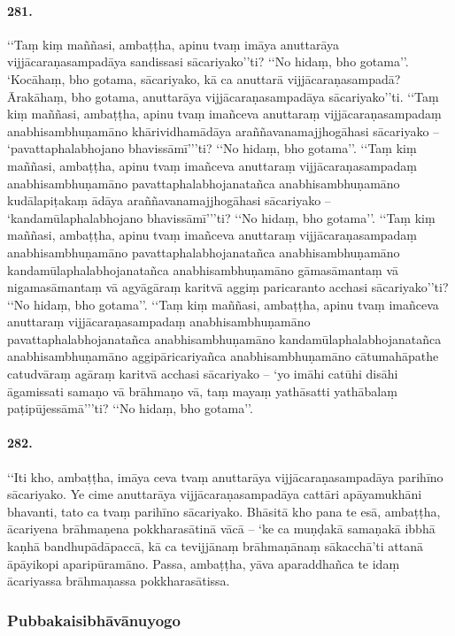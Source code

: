 \paragraph{281.} ‘‘Taṃ kiṃ maññasi, ambaṭṭha, apinu tvaṃ imāya anuttarāya vijjācaraṇasampadāya sandissasi sācariyako’’ti? ‘‘No hidaṃ, bho gotama’’. ‘Kocāhaṃ, bho gotama, sācariyako, kā ca anuttarā vijjācaraṇasampadā? Ārakāhaṃ, bho gotama, anuttarāya vijjācaraṇasampadāya sācariyako’’ti. ‘‘Taṃ kiṃ maññasi, ambaṭṭha, apinu tvaṃ imañceva anuttaraṃ vijjācaraṇasampadaṃ anabhisambhuṇamāno khārividhamādāya araññavanamajjhogāhasi sācariyako – ‘pavattaphalabhojano bhavissāmī’’’ti? ‘‘No hidaṃ, bho gotama’’. ‘‘Taṃ kiṃ maññasi, ambaṭṭha, apinu tvaṃ imañceva anuttaraṃ vijjācaraṇasampadaṃ anabhisambhuṇamāno pavattaphalabhojanatañca anabhisambhuṇamāno kudālapiṭakaṃ ādāya araññavanamajjhogāhasi sācariyako – ‘kandamūlaphalabhojano bhavissāmī’’’ti? ‘‘No hidaṃ, bho gotama’’. ‘‘Taṃ kiṃ maññasi, ambaṭṭha, apinu tvaṃ imañceva anuttaraṃ vijjācaraṇasampadaṃ anabhisambhuṇamāno pavattaphalabhojanatañca anabhisambhuṇamāno kandamūlaphalabhojanatañca anabhisambhuṇamāno gāmasāmantaṃ vā nigamasāmantaṃ vā agyāgāraṃ karitvā aggiṃ paricaranto acchasi sācariyako’’ti? ‘‘No hidaṃ, bho gotama’’. ‘‘Taṃ kiṃ maññasi, ambaṭṭha, apinu tvaṃ imañceva anuttaraṃ vijjācaraṇasampadaṃ anabhisambhuṇamāno pavattaphalabhojanatañca anabhisambhuṇamāno kandamūlaphalabhojanatañca anabhisambhuṇamāno aggipāricariyañca anabhisambhuṇamāno cātumahāpathe catudvāraṃ agāraṃ karitvā acchasi sācariyako – ‘yo imāhi catūhi disāhi āgamissati samaṇo vā brāhmaṇo vā, taṃ mayaṃ yathāsatti yathābalaṃ paṭipūjessāmā’’’ti? ‘‘No hidaṃ, bho gotama’’.

\paragraph{282.} ‘‘Iti kho, ambaṭṭha, imāya ceva tvaṃ anuttarāya vijjācaraṇasampadāya parihīno sācariyako. Ye cime anuttarāya vijjācaraṇasampadāya cattāri apāyamukhāni bhavanti, tato ca tvaṃ parihīno sācariyako. Bhāsitā kho pana te esā, ambaṭṭha, ācariyena brāhmaṇena pokkharasātinā vācā – ‘ke ca muṇḍakā samaṇakā ibbhā kaṇhā bandhupādāpaccā, kā ca tevijjānaṃ brāhmaṇānaṃ sākacchā’ti attanā āpāyikopi aparipūramāno. Passa, ambaṭṭha, yāva aparaddhañca te idaṃ ācariyassa brāhmaṇassa pokkharasātissa.

\subsubsection{Pubbakaisibhāvānuyogo}

